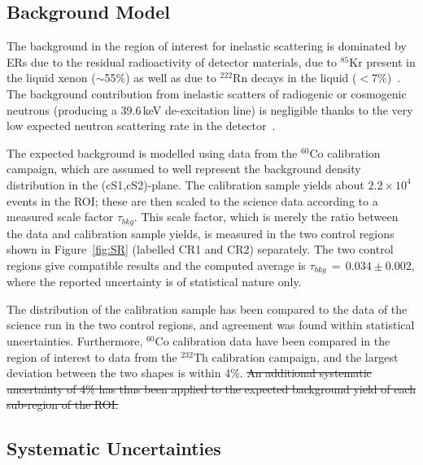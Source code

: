 \subsection {Background Model}

The background in the region of interest for inelastic scattering is dominated by ERs due to the residual radioactivity of detector materials, due to $^{85}$Kr present in the liquid xenon ($\sim$55\%) as well as due to $^{222}$Rn decays in the liquid ($<$7\%)~\cite{Aprile:2011vb}. The background contribution from inelastic scatters of radiogenic or cosmogenic neutrons (producing a 39.6\,keV de-excitation line) is negligible thanks to the very low expected neutron scattering rate in the detector~\cite{Aprile:2013tov}.


The expected background is modelled using data from the $^{60}$Co calibration campaign, which are assumed to well represent the background density distribution 
in the (cS1,cS2)-plane. The calibration sample yields  about $2.2\times10^4$ events in the ROI; these are then scaled to the science data according to a measured scale 
factor $\tau_{bkg}$. This scale factor, which is merely the ratio between the data and calibration sample yields, is measured in the two control regions shown in Figure~\ref{fig:SR} (labelled CR1 and CR2) separately. The two control regions give compatible results and the computed average is $\tau_{bkg} \, =  \, 0.034 \pm 0.002 $, where the reported uncertainty 
is of statistical nature only.

The distribution of the calibration sample has been compared to the data of the science run in the two control regions,
and agreement was found within statistical uncertainties. Furthermore, $^{60}$Co calibration data have been compared in the region of interest to  
data from the $^{232}$Th calibration campaign, and the largest deviation between the two shapes is within 4\%. 
\sout{An additional systematic uncertainty of 4\% has thus been applied to the expected background yield of each sub-region of the ROI.}




\subsection{Systematic Uncertainties}

